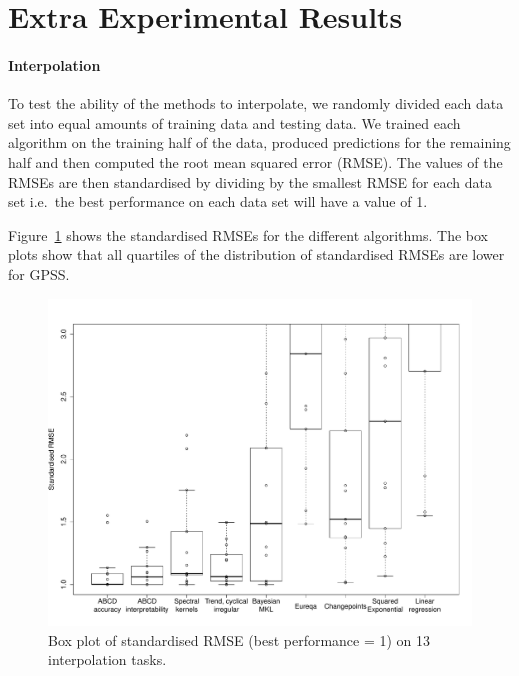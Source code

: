 \documentclass{article}
\def\ie{i.e.\ }
\begin{document}
\section{Extra Experimental Results}
\paragraph{Interpolation}

To test the ability of the methods to interpolate, we randomly divided each data set into equal amounts of training data and testing data.
We trained each algorithm on the training half of the data, produced predictions for the remaining half and then computed the root mean squared error (RMSE).
The values of the RMSEs are then standardised by dividing by the smallest RMSE for each data set \ie the best performance on each data set will have a value of 1.

Figure~\ref{fig:box_interp} shows the standardised RMSEs for the different algorithms.
The box plots show that all quartiles of the distribution of standardised RMSEs are lower for GPSS.

\begin{figure}[h]
\centering
\includegraphics[width=\textwidth]{figures/box_interp}
\caption{
Box plot of standardised RMSE (best performance = 1) on 13 interpolation tasks.
}
\label{fig:box_interp}
\end{figure}
\end{document}
